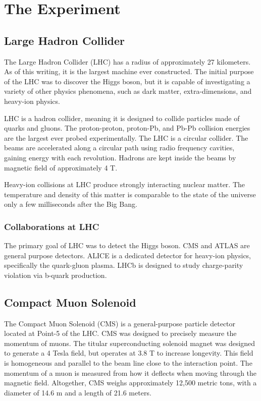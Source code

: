 
\chapter{The Experiment}

\section{Large Hadron Collider}

The Large Hadron Collider (LHC) has a radius of approximately 27 kilometers. As of this writing, it is the largest machine ever constructed. The initial purpose of the LHC was to discover the Higgs boson, but it is capable of investigating a variety of other physics phenomena, such as dark matter, extra-dimensions, and heavy-ion physics.

LHC is a hadron collider, meaning it is designed to collide particles made of quarks and gluons. The proton-proton, proton-Pb, and Pb-Pb collision energies are the largest ever probed experimentally. The LHC is a circular collider. The beams are accelerated along a circular path using radio frequency cavities, gaining energy with each revolution. Hadrons are kept inside the beams by magnetic field of approximately 4 T. 

Heavy-ion collisions at LHC produce strongly interacting nuclear matter. The temperature and density of this matter is comparable to the state of the universe only a few milliseconds after the Big Bang.

\subsection{Collaborations at LHC}

The primary goal of LHC was to detect the Higgs boson. CMS and ATLAS are general purpose detectors. ALICE is a dedicated detector for heavy-ion physics, specifically the quark-gluon plasma. LHCb is designed to study charge-parity violation via b-quark production.

\section{Compact Muon Solenoid}

The Compact Muon Solenoid (CMS) is a general-purpose particle detector located at Point-5 of the LHC. CMS was designed to precisely measure the momentum of muons. The titular superconducting solenoid magnet was designed to generate a 4 Tesla field, but operates at 3.8 T to increase longevity. This field is homogeneous and parallel to the beam line close to the interaction point. The momentum of a muon is measured from how it deflects when moving through the magnetic field. Altogether, CMS weighs approximately 12,500 metric tons, with a diameter of 14.6 m and a length of 21.6 meters.

